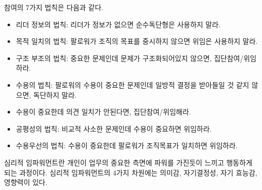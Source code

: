 참여의 7가지 법칙은 다음과 같다.
\begin{itemize}
  \item 리더 정보의 법칙: 리더가 정보가 없으면 순수독단형은 사용하지 말라.
  \item 목적 일치의 법칙: 팔로워가 조직의 목표를 중시하지 않으면 위임은 사용하지 말라.
  \item 구조 부조의 법칙: 중요한 문제인데 문제가 구조화되어있지 않으면, 집단참여/위임하라.
  \item 수용의 법칙: 팔로워의 수용이 중요한 문제인데 일방적 결정을 받아들일 것 같지 않으면, 독단하지 말라.
  \item 수용이 중요한데 의견 일치가 안된다면, 집단참여/위임해라.
  \item 공평성의 법칙: 비교적 사소한 문제인데 수용이 중요하면 위임하라.
  \item 수용우선의 법칙: 수용이 중요한데 팔로워가 조직목표가 일치하면 위임하라.
\end{itemize}

심리적 임파워먼트란 개인이 업무의 중요한 측면에 파워를 가진듯이 느끼고 행동하게 되는 과정이다.
심리적 임파워먼트의 4가지 차원에는 의미감, 자기결정성, 자기 효능감, 영향력이 있다.